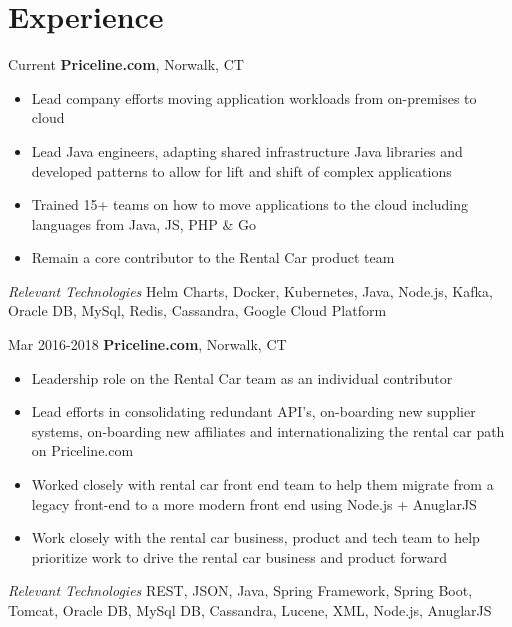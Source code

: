 \documentclass[a4paper,online]{adcv}
\begin{document}
\section{Experience}
\begin{adcvtabletwo}
   {Current}
  {\textbf{Priceline.com}, Norwalk, CT}
  \begin{itemize}
    \item Lead company efforts moving application workloads from on-premises to cloud
    \item Lead Java engineers, adapting shared infrastructure Java libraries and developed patterns to allow for lift and shift of complex applications
    \item Trained 15+ teams on how to move applications to the cloud including languages from Java, JS, PHP \& Go
    \item Remain a core contributor to the Rental Car product team
  \end{itemize}
  \adcvrowskip
  \emph{Relevant Technologies} Helm Charts, Docker, Kubernetes, Java, Node.js, Kafka, Oracle DB, MySql, Redis, Cassandra, Google Cloud Platform

  \adcvrowskip
  \adcvrowskip
   {Mar 2016-2018}
  {\textbf{Priceline.com}, Norwalk, CT}
  \begin{itemize}
    \item Leadership role on the Rental Car team as an individual contributor
    \item Lead efforts in consolidating redundant API's, on-boarding new supplier systems, on-boarding new affiliates and internationalizing the rental car path on Priceline.com
    \item Worked closely with rental car front end team to help them migrate from a legacy front-end to a more modern front end using Node.js + AnuglarJS
    \item Work closely with the rental car business, product and tech team to help prioritize work to drive the rental car business and product forward
  \end{itemize}
  \adcvrowskip
  \emph{Relevant Technologies} REST, JSON, Java, Spring Framework, Spring Boot, Tomcat, Oracle DB, MySql DB, Cassandra, Lucene, XML, Node.js, AnuglarJS


\end{adcvtabletwo}
\end{document}
